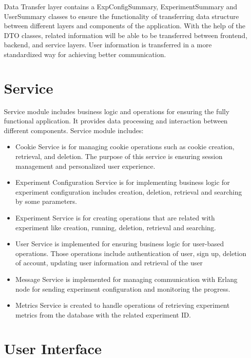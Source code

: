 Data Transfer layer contains a ExpConfigSummary, ExperimentSummary and UserSummary classes to ensure the functionality of transferring data structure between different layers and components of the application. With the help of the DTO classes,
related information will be able to be transferred between frontend, backend, and service layers. User information is transferred in a more standardized way
for achieving better communication.

\section{Service}

Service module includes business logic and operations for ensuring the fully functional application. It provides data processing and interaction between different components. Service module includes:\\
\begin{itemize}
    \item Cookie Service is for managing cookie operations such as cookie creation, retrieval, and deletion. The purpose of this service is ensuring session management and personalized user experience.
    \item Experiment Configuration Service is for implementing business logic for experiment configuration includes creation, deletion, retrieval and searching by some parameters.
    \item Experiment Service is for creating operations that are related with experiment like creation, running, deletion, retrieval and searching.
    \item User Service is implemented for ensuring business logic for user-based operations. Those operations include authentication of user, sign up, deletion of account, updating user information and retrieval of the user
    \item Message Service is implemented for managing communication with Erlang node for sending experiment configuration and monitoring the progress.
    \item Metrics Service is created to handle operations of retrieving experiment metrics from the database with the related experiment ID.
\end{itemize}

\section{User Interface}

